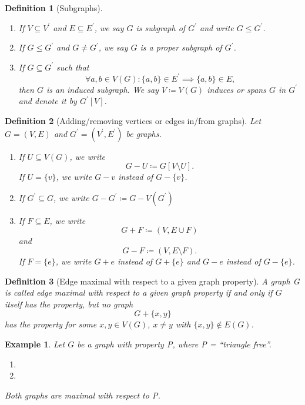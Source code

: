 \documentclass[a4paper]{article}
\newtheorem*{defi*}{Definition}
\newtheorem*{ex}{Example}
\begin{document}
\begin{defi*}[Subgraphs]
  \begin{enumerate}
    \item If $V \subseteq V^\prime$ and $E \subseteq E^\prime$, we say $G$ is \emph{subgraph} of $G^\prime$ and write $G \leq G^\prime$.
    \item If $G \leq G^\prime$ and $G \neq G^\prime$, we say $G$ is a \emph{proper subgraph} of $G^\prime$.
    \item If $G \subseteq G^\prime$ such that 
    \[ \forall a,b \in V(G) : \{a,b\} \in E^\prime \implies \{a,b\} \in E \text{,} \]
    then $G$ is an \emph{induced subgraph}.
    We say $V \coloneqq V(G)$ \emph{induces or spans} $G$ in $G^\prime$ and denote it by $G^\prime[V]$.
  \end{enumerate}
\end{defi*}

\begin{defi*}[Adding/removing vertices or edges in/from graphs]
  Let $G = (V,E)$ and $G^\prime = (V^\prime,E^\prime)$ be graphs.
  \begin{enumerate}[label=(\alph*)]
    \item If $U \subseteq V(G)$, we write 
    \[G - U \coloneqq G[V\setminus U] \text{.} \]
    If $U = \{v\}$, we write $G - v$ instead of $G - \{v\}$.
    \item If $G^\prime \subseteq G$, we write $G - G^\prime \coloneqq G - V(G^\prime)$
    \item If $F \subseteq E$, we write 
    \[ G + F \coloneqq (V, E \cup F) \]
    and
    \[ G - F \coloneqq (V, E \setminus F) \text{.} \]
    If $F = \{e\}$, we write $G + e$ instead of $G + \{e\}$ and $G - e$ instead of $G - \{e\}$.
  \end{enumerate}
\end{defi*}

\begin{defi*}[Edge maximal with respect to a given graph property]
A graph G is called \emph{edge maximal with respect to a given graph property} if and only if $G$ itself has the property, but no graph 
\[ G + \{x,y\} \]
has the property for some $x,y \in V(G)$, $x \neq y$ with $\{x,y\} \notin E(G)$.
\end{defi*}

\begin{ex}
  Let $G$ be a graph with property P, where P = \enquote{triangle free}.
  \begin{enumerate}[label=(\alph*)]
    \item {}
    \item {}
  \end{enumerate}
  Both graphs are maximal with respect to P.
\end{ex}
\end{document}
